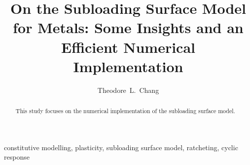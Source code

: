 \documentclass[3p,sort&compress,11pt,fleqn,review]{elsarticle}
\begin{document}
\linenumbers
\begin{abstract}
    \begin{linenumbers}
        This study focuses on the numerical implementation of the subloading surface model.
    \end{linenumbers}
\end{abstract}
\begin{keyword}
    constitutive modelling\sep
    plasticity\sep
    subloading surface model\sep
    ratcheting\sep
    cyclic response
\end{keyword}
\begin{frontmatter}
    \title{On the Subloading Surface Model for Metals: Some Insights and an Efficient Numerical Implementation}
    \author[add1]{Theodore~L.~Chang}
    \address[add1]{IRIS Adlershof, Humboldt-Universität zu Berlin, Berlin, Germany, 12489.}
\end{frontmatter}




\end{document}
